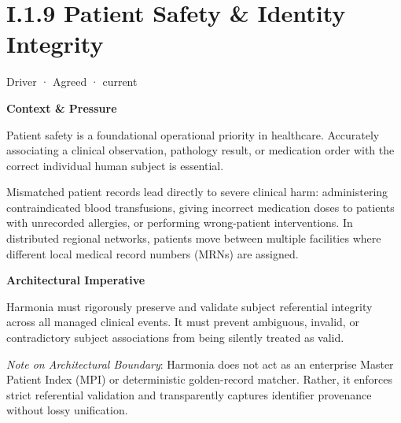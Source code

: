 \section*{I.1.9 Patient Safety \& Identity Integrity}
\label{navigation:I.1.9}

\label{element:b835c7b1055e4dbc9e1cd3a0c545c1c8}
{\small Driver · Agreed · current}\par

\par\medskip\textbf{Context \& Pressure}\par


Patient safety is a foundational operational priority in healthcare. Accurately associating a clinical observation, pathology result, or medication order with the correct individual human subject is essential.



Mismatched patient records lead directly to severe clinical harm: administering contraindicated blood transfusions, giving incorrect medication doses to patients with unrecorded allergies, or performing wrong-patient interventions. In distributed regional networks, patients move between multiple facilities where different local medical record numbers (MRNs) are assigned.



\par\medskip\textbf{Architectural Imperative}\par


Harmonia must rigorously preserve and validate subject referential integrity across all managed clinical events. It must prevent ambiguous, invalid, or contradictory subject associations from being silently treated as valid.



\emph{Note on Architectural Boundary}: Harmonia does not act as an enterprise Master Patient Index (MPI) or deterministic golden-record matcher. Rather, it enforces strict referential validation and transparently captures identifier provenance without lossy unification.



